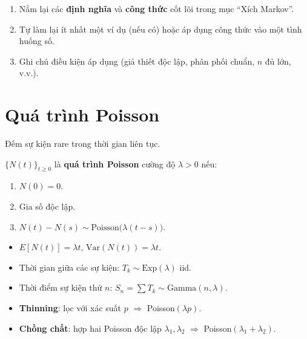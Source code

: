 \documentclass[12pt,a4paper]{article}
\begin{document}
\begin{tongket}[title={Tổng kết: Xích Markov}]
\begin{enumerate}
  \item Nắm lại các \textbf{định nghĩa} và \textbf{công thức} cốt lõi trong mục ``Xích Markov''.
  \item Tự làm lại ít nhất một ví dụ (nếu có) hoặc áp dụng công thức vào một tình huống số.
  \item Ghi chú điều kiện áp dụng (giả thiết độc lập, phân phối chuẩn, $n$ đủ lớn, v.v.).
\end{enumerate}
\end{tongket}

\section{Quá trình Poisson}

\begin{dongco}[title={Động cơ --- Quá trình Poisson}]
Đếm sự kiện rare trong thời gian liên tục.
\end{dongco}

\begin{dinhnghia}
  $\{N(t)\}_{t \ge 0}$ là \textbf{quá trình Poisson} cường độ $\lambda > 0$ nếu:
  \begin{enumerate}
    \item $N(0) = 0$.
    \item Gia số độc lập.
    \item $N(t) - N(s) \sim \text{Poisson}\bigl(\lambda(t-s)\bigr)$.
  \end{enumerate}
\end{dinhnghia}

\begin{tinhchat}
  \begin{itemize}
    \item $E[N(t)] = \lambda t$, $\text{Var}(N(t)) = \lambda t$.
    \item Thời gian giữa các sự kiện: $T_k \sim \text{Exp}(\lambda)$ iid.
    \item Thời điểm sự kiện thứ $n$: $S_n = \sum T_k \sim \text{Gamma}(n, \lambda)$.
    \item \textbf{Thinning}: lọc với xác suất $p$ $\Rightarrow$ Poisson$(\lambda p)$.
    \item \textbf{Chồng chất}: hợp hai Poisson độc lập $\lambda_1, \lambda_2$ $\Rightarrow$ Poisson$(\lambda_1 + \lambda_2)$.
  \end{itemize}
\end{tinhchat}
\end{document}
